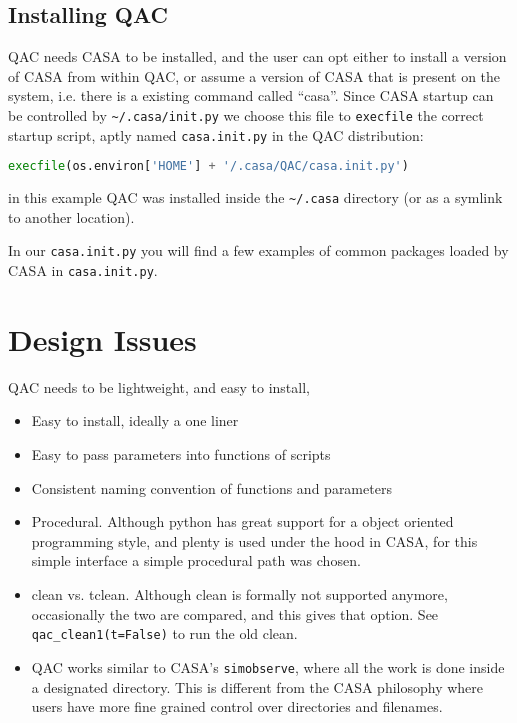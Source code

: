 \documentclass[12pt,a4paper]{article}
\begin{document}
\subsection{Installing QAC}

QAC needs CASA to be installed, and the user can opt either to install a version
of CASA from within QAC, or assume a version of CASA that is present on the system, i.e. there
is a existing command called ``casa''. Since CASA startup can be controlled by
\verb+~/.casa/init.py+ we choose this file to {\tt execfile} the correct startup script,
aptly named {\tt casa.init.py} in the QAC distribution:

\begin{lstlisting}[language=python]
    execfile(os.environ['HOME'] + '/.casa/QAC/casa.init.py')
\end{lstlisting}

in this example QAC was installed inside the \verb+~/.casa+ directory (or as a symlink
to another location).

\noindent
In our {\tt casa.init.py} you will find a few examples of common packages loaded by CASA in {\tt casa.init.py}.


\section{Design Issues}

QAC needs to be lightweight, and easy to install,

\begin{itemize}

\item
  Easy to install, ideally a one liner

\item
  Easy to pass parameters into functions of scripts

\item
  Consistent naming convention of functions and parameters

\item
  Procedural. Although python has great support for a object oriented
  programming style, and plenty is used under the hood in CASA, for
  this simple interface a simple procedural path was chosen.

\item
  clean vs. tclean. Although clean is formally not supported anymore, occasionally the two are compared, and
  this gives that option. See \verb+qac_clean1(t=False)+ to run the old clean.

\item
  QAC works similar to CASA's \verb+simobserve+, where all the work is done inside a designated directory. This is
  different from the CASA philosophy where users have more fine grained control over directories and filenames.
  
\end{itemize}
\end{document}
